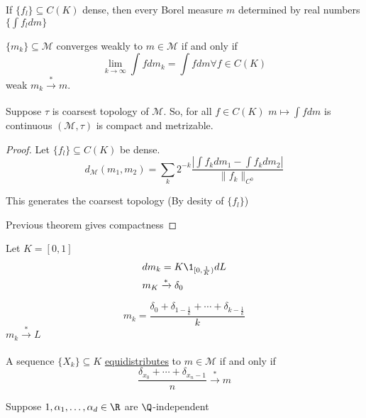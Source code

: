 \begin{remark}
	If $\{ f_l \} \subseteq C(K)$ dense, then every Borel measure $m$ determined by real numbers 
	$\{ \int f_l dm\}$
\end{remark}

\begin{definition}
	$\{m_k \} \subseteq \mathcal{M}$ converges weakly to $m \in \mathcal{M}$ if and only if 
	\[
		\lim_{k \to \infty} \int f dm_k = \int f dm \forall f \in C(K)
	\] 
	weak $m_k \xrightarrow[]{*} m$.
\end{definition}

\begin{theorem}
	Suppose $\tau$ is coarsest topology of $\mathcal{M}$. So, for all $f \in C(K)$  $m \mapsto \int f dm$ is continuous
	 $(\mathcal{M}, \tau)$ is compact and metrizable.
\end{theorem}
\begin{proof}
	Let $\{f_l\} \subseteq C(K)$ be dense.
	\[
		d_{\mathcal{M}} (m_1, m_2) = \sum_{k} 2^{-k} \frac{| \int f_k dm_1 - \int f_k dm_2 |}{\| f_k \|_{C^0}}
	\] 

\begin{exercise}
This generates the coarsest topology (By desity of $\{f_l\}$)
\end{exercise}

Previous theorem gives compactness
\end{proof}

\begin{example}
	Let $K = [0,1]$ 
	\begin{align*}
		&dm_{k} = K \1_{[0,\frac{1}{K})} dL \\
		&m_K \xrightarrow[]{*} \delta_0
	\end{align*} 
\end{example}

\begin{example}
	\[
		m_k = \frac{\delta_0 + \delta_{1 - \frac{1}{k}} + \cdots + \delta_{k - \frac{1}{k}}}{k}
	\] 
	$m_k \xrightarrow[]{*} L$
\end{example}

\begin{definition}
	A sequence $\{X_k\} \subseteq K$ \underline{equidistributes} to $m \in \mathcal{M}$ if and only if
	 \[
		 \frac{\delta_{x_0} + \cdots + \delta_{x_{n} - 1}}{n} \xrightarrow[]{*} m
	\] 
\end{definition}

\begin{example}
	Suppose $1, \alpha_1, \ldots , \alpha_d \in \R$ are $\Q$-independent
\end{example}

